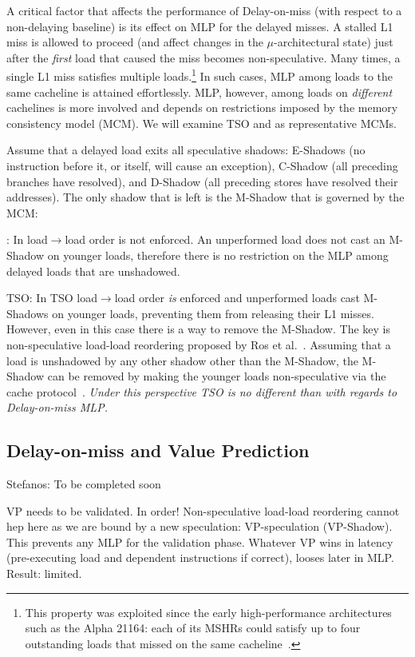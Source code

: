 A critical factor that affects the performance of Delay-on-miss (with respect to a non-delaying baseline) is its effect on MLP for the delayed misses. 
A stalled L1 miss is allowed to proceed (and affect changes in the $\mu$-architectural state) just after the \emph{first} load that caused the miss becomes non-speculative.
Many times, a single L1 miss satisfies multiple loads.\footnote{This property was exploited since the early high-performance architectures such as the Alpha 21164: each of its MSHRs could satisfy up to four outstanding loads that missed on the same cacheline~\cite{alpha21164}.} 
In such cases, MLP among loads to the same cacheline is attained effortlessly.
MLP, however, among loads on \emph{different} cachelines is more involved and depends on restrictions imposed by the memory consistency model (MCM). We will examine TSO and {\rc} as representative MCMs.

Assume that a delayed load exits all speculative shadows: E-Shadows (no instruction before it, or itself, will cause an exception), C-Shadow (all preceding branches have resolved), and D-Shadow (all preceding stores have resolved their addresses). The only shadow that is left is the M-Shadow that is governed by the MCM:
\squishlist
\item {\rc}: In {\rc} load$\rightarrow$load order is not enforced. An unperformed load does not cast an M-Shadow on younger loads, therefore there is no restriction on the MLP among delayed loads that are unshadowed.
\item TSO: In TSO load$\rightarrow$load order \emph{is} enforced and unperformed loads cast M-Shadows on younger loads, preventing them from releasing their L1 misses. However, even in this case there is a way to remove the M-Shadow. The key is non-speculative load-load reordering proposed by Ros et al.~\cite{aros-isca17}. Assuming that a load is unshadowed by any other shadow other than the M-Shadow, the M-Shadow can be removed by making the younger loads non-speculative via the cache protocol~\cite{aros-isca17}. \emph{Under this perspective TSO is no different than {\rc} with regards to Delay-on-miss MLP.}
\squishend

\subsection{Delay-on-miss and Value Prediction} 

{\color{red} Stefanos: To be completed soon}

VP needs to be validated. In order! Non-speculative load-load reordering cannot hep here as we are bound by a new speculation: VP-speculation (VP-Shadow). This prevents any MLP for the validation phase. Whatever VP wins in latency (pre-executing load and dependent instructions if correct), looses later in MLP. Result: limited.

